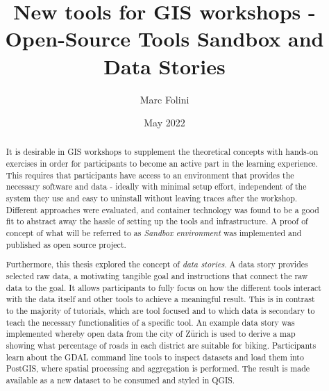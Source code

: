 \documentclass[11pt, a4paper, oneside, parskip=full-]{scrartcl}
\title{New tools for GIS workshops - Open-Source Tools Sandbox and Data Stories}
\author{Marc Folini}
\date{May 2022}
\begin{document}
\begin{titlepage}
  \setcounter{page}{1}
  \clearpage\maketitle
  \thispagestyle{empty}
  \begin{abstract}
    It is desirable in GIS workshops to supplement the theoretical concepts with
    hands-on exercises in order for participants to become an active part in the
    learning experience. This requires that participants have access to an
    environment that provides the necessary software and data - ideally with
    minimal setup effort, independent of the system they use and easy to
    uninstall without leaving traces after the workshop. Different approaches
    were evaluated, and container technology was found to be a good fit to
    abstract away the hassle of setting up the tools and infrastructure. A proof
    of concept of what will be referred to as \emph{Sandbox environment} was
    implemented and published as open source project.

    Furthermore, this thesis explored the concept of \emph{data stories}. A data
    story provides selected raw data, a motivating tangible goal and
    instructions that connect the raw data to the goal. It allows participants
    to fully focus on how the different tools interact with the data itself and
    other tools to achieve a meaningful result. This is in contrast to the
    majority of tutorials, which are tool focused and to which data is secondary
    to teach the necessary functionalities of a specific tool. An example data
    story was implemented whereby open data from the city of Zürich is used to
    derive a map showing what percentage of roads in each district are suitable
    for biking. Participants learn about the GDAL\cite{gdal} command line tools
    to inspect datasets and load them into PostGIS\cite{postgis}, where spatial
    processing and aggregation is performed. The result is made available as a
    new dataset to be consumed and styled in QGIS\cite{qgis}.
  \end{abstract}
\end{titlepage}

\newpage
\tableofcontents

\newpage
{}
\setcounter{page}{1}
\end{document}
